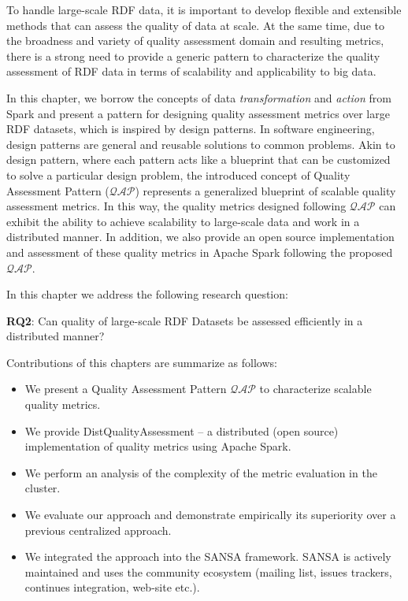 To handle large-scale RDF data, it is important to develop flexible and extensible methods that can assess the quality of data at scale. 
At the same time, due to the broadness and variety of quality assessment domain and resulting metrics, there is a strong need to provide a generic pattern
to characterize the quality assessment of RDF data in terms of scalability and applicability to big data.

In this chapter, we borrow the concepts of data \textit{transformation} and \textit{action} from Spark and present a 
pattern for designing quality assessment metrics over large RDF datasets, which is inspired by design patterns.
In software engineering, design patterns are general and reusable solutions to common problems. 
Akin to design pattern, where each pattern acts like a blueprint that can be customized to solve a particular design problem, 
the introduced concept of Quality Assessment Pattern ($\mathcal{QAP}$) represents a generalized blueprint of scalable quality assessment metrics. 
In this way, the quality metrics designed following $\mathcal{QAP}$ can exhibit the ability to achieve scalability to large-scale data and work in a distributed manner.
In addition, we also provide an open source implementation and assessment of these quality metrics in Apache Spark following the proposed $\mathcal{QAP}$.

In this chapter we address the following research question:

\begin{tcolorbox}
\textbf{RQ2}: Can quality of large-scale RDF Datasets be assessed efficiently in a distributed manner?
\end{tcolorbox}

Contributions of this chapters are summarize as follows:
\begin{itemize}
    \item We present a Quality Assessment Pattern $\mathcal{QAP}$ to characterize scalable quality metrics.
    \item We provide DistQualityAssessment -- a distributed (open source) implementation of quality metrics using Apache Spark.
    \item We perform an analysis of the complexity of the metric evaluation in the cluster.
    \item We evaluate our approach and demonstrate empirically its superiority over a previous centralized approach.
    \item We integrated the approach into the SANSA framework.
    SANSA is actively maintained and uses the community ecosystem (mailing list, issues trackers, continues integration, web-site etc.).
\end{itemize}


